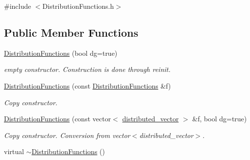 {\ttfamily \#include $<$DistributionFunctions.h$>$}\subsection*{Public Member Functions}
\begin{DoxyCompactItemize}
\item 
\hyperlink{classnatrium_1_1DistributionFunctions_a3c886085011c99c505cdfc4903e20dfd}{DistributionFunctions} (bool dg=true)
\begin{DoxyCompactList}\small\item\em empty constructor. Construction is done through reinit. \item\end{DoxyCompactList}\item 
\hypertarget{classnatrium_1_1DistributionFunctions_af0a970355419acf79be898e573f3149a}{
\hyperlink{classnatrium_1_1DistributionFunctions_af0a970355419acf79be898e573f3149a}{DistributionFunctions} (const \hyperlink{classnatrium_1_1DistributionFunctions}{DistributionFunctions} \&f)}
\label{classnatrium_1_1DistributionFunctions_af0a970355419acf79be898e573f3149a}

\begin{DoxyCompactList}\small\item\em Copy constructor. \item\end{DoxyCompactList}\item 
\hypertarget{classnatrium_1_1DistributionFunctions_a43739b1d781e72fa21740dc4dcfe7a54}{
\hyperlink{classnatrium_1_1DistributionFunctions_a43739b1d781e72fa21740dc4dcfe7a54}{DistributionFunctions} (const vector$<$ \hyperlink{namespacenatrium_a903d2b92917f582f2ff05f52160ab811}{distributed\_\-vector} $>$ \&f, bool dg=true)}
\label{classnatrium_1_1DistributionFunctions_a43739b1d781e72fa21740dc4dcfe7a54}

\begin{DoxyCompactList}\small\item\em Copy constructor. Conversion from vector$<$distributed\_\-vector$>$. \item\end{DoxyCompactList}\item 
\hypertarget{classnatrium_1_1DistributionFunctions_af965a46fbf124e8f90250c843e615bcd}{
virtual \hyperlink{classnatrium_1_1DistributionFunctions_af965a46fbf124e8f90250c843e615bcd}{$\sim$DistributionFunctions} ()}
\label{classnatrium_1_1DistributionFunctions_af965a46fbf124e8f90250c843e615bcd}


\end{DoxyCompactItemize}
